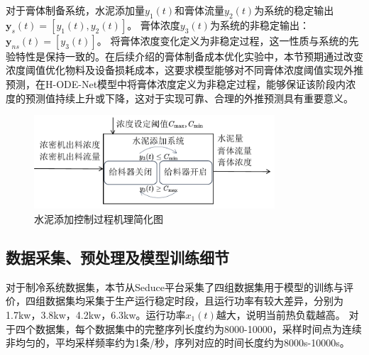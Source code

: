 对于膏体制备系统，水泥添加量$y_1(t)$和膏体流量$y_2(t)$为系统的稳定输出$\boldsymbol y_s(t)=[y_1(t), y_2(t)]$。
膏体浓度$y_3(t)$为系统的非稳定输出：$\boldsymbol y_{ns}(t)=[y_3(t)]$。
将膏体浓度变化定义为非稳定过程，这一性质与系统的先验特性是保持一致的。在后续介绍的膏体制备成本优化实验中，本节预期通过改变浓度阈值优化物料及设备损耗成本，这要求模型能够对不同膏体浓度阈值实现外推预测，在H-ODE-Net模型中将膏体浓度定义为非稳定过程，能够保证该阶段内浓度的预测值持续上升或下降，这对于实现可靠、合理的外推预测具有重要意义。
\begin{figure}[h]
    \centering
    \includegraphics[width=0.8\textwidth]{figures/chapter4/add_cement_workloop.pdf}
  \caption{水泥添加控制过程机理简化图}
  \label{fig:add_cement_workloop} 
\end{figure}


\subsection{数据采集、预处理及模型训练细节}

对于制冷系统数据集，本节从Seduce平台采集了四组数据集用于模型的训练与评价，四组数据集均采集于生产运行稳定时段，且运行功率有较大差异，分别为1.7kw，3.8kw，4.2kw，6.3kw。运行功率$x_1(t)$越大，说明当前热负载越高。
对于四个数据集，每个数据集中的完整序列长度约为8000-10000，采样时间点为连续非均匀的，平均采样频率约为1条/秒，序列对应的时间长度约为8000s-10000s。

